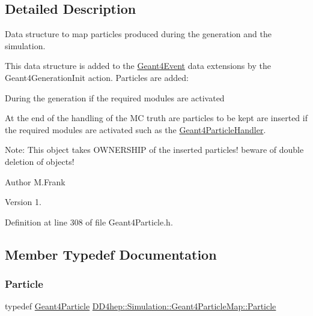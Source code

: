 \subsection{Detailed Description}
Data structure to map particles produced during the generation and the simulation. 

This data structure is added to the \hyperlink{class_d_d4hep_1_1_simulation_1_1_geant4_event}{Geant4\+Event} data extensions by the Geant4\+Generation\+Init action. Particles are added\+:
\begin{DoxyItemize}
\item During the generation if the required modules are activated
\item At the end of the handling of the MC truth are particles to be kept are inserted if the required modules are activated such as the \hyperlink{class_d_d4hep_1_1_simulation_1_1_geant4_particle_handler}{Geant4\+Particle\+Handler}.
\end{DoxyItemize}

Note\+: This object takes O\+W\+N\+E\+R\+S\+H\+IP of the inserted particles! beware of double deletion of objects!

\begin{DoxyAuthor}{Author}
M.\+Frank 
\end{DoxyAuthor}
\begin{DoxyVersion}{Version}
1. 
\end{DoxyVersion}


Definition at line 308 of file Geant4\+Particle.\+h.



\subsection{Member Typedef Documentation}
\hypertarget{class_d_d4hep_1_1_simulation_1_1_geant4_particle_map_a01ed68f2fc2e55ecf936e5ac3e6eae5f}{}\label{class_d_d4hep_1_1_simulation_1_1_geant4_particle_map_a01ed68f2fc2e55ecf936e5ac3e6eae5f} 
\subsubsection{\texorpdfstring{Particle}{Particle}}
{\footnotesize\ttfamily typedef \hyperlink{class_d_d4hep_1_1_simulation_1_1_geant4_particle}{Geant4\+Particle} \hyperlink{class_d_d4hep_1_1_simulation_1_1_geant4_particle_map_a01ed68f2fc2e55ecf936e5ac3e6eae5f}{D\+D4hep\+::\+Simulation\+::\+Geant4\+Particle\+Map\+::\+Particle}}



